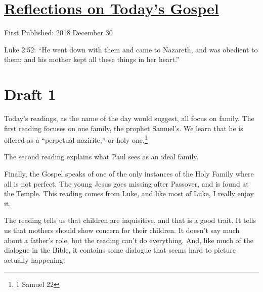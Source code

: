 \documentclass[12pt]{article}[titlepage]
\newcommand{\say}[1]{``#1''}
\newcommand{\1}{\={a}}
\newcommand{\2}{\={e}}
\newcommand{\3}{\={\i}}
\newcommand{\4}{\=o}
\newcommand{\5}{\=u}
\newcommand{\6}{\={A}}
\renewcommand{\,}{\textsuperscript{,}}
\begin{document}
\doublespacing
\section{\href{reflections-on-readings-holy-family-c.html}{Reflections on Today's Gospel}}
First Published: 2018 December 30

Luke 2:52: \say{He went down with them and came to Nazareth, and was obedient to them; and his mother kept all these things in her heart.}

\section{Draft 1}
Today's readings, as the name of the day would suggest, all focus on family.
The first reading focuses on one family, the prophet Samuel's.
We learn that he is offered as a \say{perpetual nazirite,} or holy one.\footnote{1 Samuel 22}

The second reading explains what Paul sees as an ideal family.

Finally, the Gospel speaks of one of the only instances of the Holy Family where all is not perfect.
The young Jesus goes missing after Passover, and is found at the Temple.
This reading comes from Luke, and like most of Luke, I really enjoy it.

The reading tells us that children are inquisitive, and that is a good trait.
It tells us that mothers should show concern for their children.
It doesn't say much about a father's role, but the reading can't do everything.
And, like much of the dialogue in the Bible, it contains some dialogue that seems hard to picture actually happening.
\end{document}
